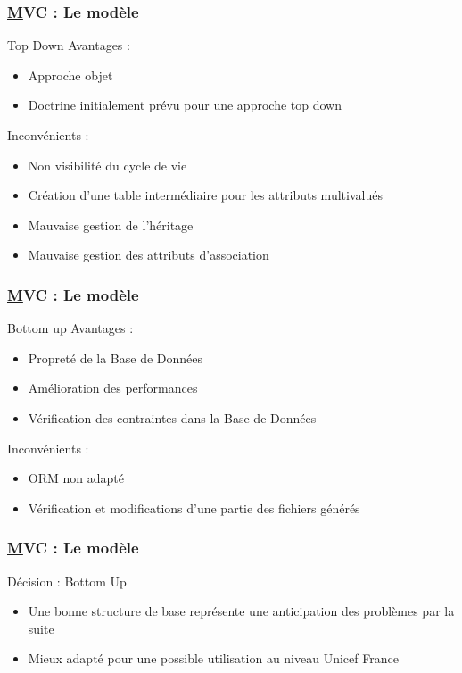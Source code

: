 \speaker{\Julie}
\begin{frame}
	\frametitle{\underline{M}VC : Le modèle}
	\begin{block}{Top Down}
		Avantages :
		\begin{itemize}
			\item Approche objet
			\item Doctrine initialement prévu pour une approche top down
		\end{itemize}
 
		Inconvénients :
		\begin{itemize}
			\item Non visibilité du cycle de vie
			\item Création d'une table intermédiaire pour les attributs multivalués
			\item Mauvaise gestion de l'héritage
			\item Mauvaise gestion des attributs d'association
			
		\end{itemize}
	\end{block}
\end{frame}


\begin{frame}
	\frametitle{\underline{M}VC : Le modèle}
	\begin{block}{Bottom up}
	Avantages :
		\begin{itemize}
			\item Propreté de la Base de Données
			\item Amélioration des performances
			\item Vérification des contraintes dans la Base de Données
		\end{itemize} 
	Inconvénients :
		\begin{itemize}
			\item ORM non adapté
			\item Vérification et modifications d'une partie des fichiers générés
		\end{itemize}
	\end{block}
  
\end{frame}


\begin{frame}
	\frametitle{\underline{M}VC : Le modèle}
	\begin{block}{Décision : Bottom Up}
		\begin{itemize}
		\item Une bonne structure de base représente une anticipation des problèmes par la suite 
		\item Mieux adapté pour une possible utilisation au niveau Unicef France
		\end{itemize}
		
		
	\end{block}
\end{frame}